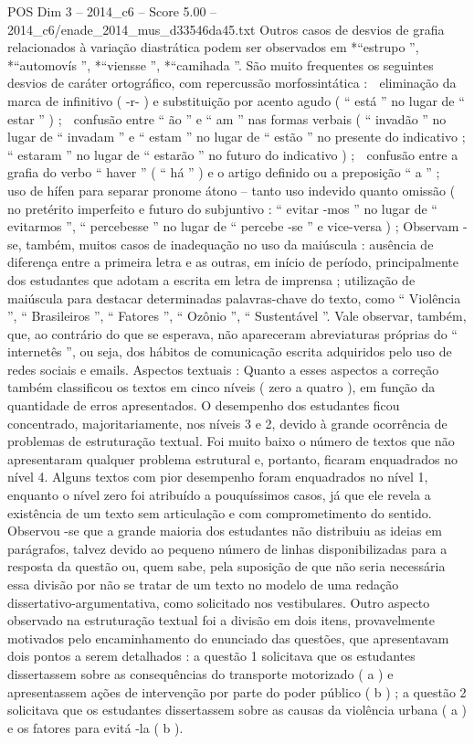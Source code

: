 \begin{textsample}{POS Dim 3 – 2014\_c6 – Score 5.00 – 2014\_c6/enade\_2014\_mus\_d33546da45.txt}
Outros casos de desvios de grafia relacionados à variação diastrática podem ser observados em *“estrupo ”, *“automovís ”, *“viensse ”, *“camihada ”.
São muito frequentes os seguintes desvios de caráter ortográfico, com repercussão morfossintática :  eliminação da marca de infinitivo ( -r- ) e substituição por acento agudo ( “ está ” no lugar de “ estar ” ) ;  confusão entre “ ão ” e “ am ” nas formas verbais ( “ invadão ” no lugar de “ invadam ” e “ estam ” no lugar de “ estão ” no presente do indicativo ; “ estaram ” no lugar de “ estarão ” no futuro do indicativo ) ;  confusão entre a grafia do verbo “ haver ” ( “ há ” ) e o artigo definido ou a preposição “ a ” ;  uso de hífen para separar pronome átono – tanto uso indevido quanto omissão ( no pretérito imperfeito e futuro do subjuntivo : “ evitar -mos ” no lugar de “ evitarmos ”, “ percebesse ” no lugar de “ percebe -se ” e vice-versa ) ; Observam -se, também, muitos casos de inadequação no uso da maiúscula : ausência de diferença entre a primeira letra e as outras, em início de período, principalmente dos estudantes que adotam a escrita em letra de imprensa ; utilização de maiúscula para destacar determinadas palavras-chave do texto, como “ Violência ”, “ Brasileiros ”, “ Fatores ”, “ Ozônio ”, “ Sustentável ”.
Vale observar, também, que, ao contrário do que se esperava, não apareceram abreviaturas próprias do “ internetês ”, ou seja, dos hábitos de comunicação escrita adquiridos pelo uso de redes sociais e emails.
Aspectos textuais : Quanto a esses aspectos a correção também classificou os textos em cinco níveis ( zero a quatro ), em função da quantidade de erros apresentados.
O desempenho dos estudantes ficou concentrado, majoritariamente, nos níveis 3 e 2, devido à grande ocorrência de problemas de estruturação textual.
Foi muito baixo o número de textos que não apresentaram qualquer problema estrutural e, portanto, ficaram enquadrados no nível 4.
Alguns textos com pior desempenho foram enquadrados no nível 1, enquanto o nível zero foi atribuído a pouquíssimos casos, já que ele revela a existência de um texto sem articulação e com comprometimento do sentido.
Observou -se que a grande maioria dos estudantes não distribuiu as ideias em parágrafos, talvez devido ao pequeno número de linhas disponibilizadas para a resposta da questão ou, quem sabe, pela suposição de que não seria necessária essa divisão por não se tratar de um texto no modelo de uma redação dissertativo-argumentativa, como solicitado nos vestibulares.
Outro aspecto observado na estruturação textual foi a divisão em dois itens, provavelmente motivados pelo encaminhamento do enunciado das questões, que apresentavam dois pontos a serem detalhados : a questão 1 solicitava que os estudantes dissertassem sobre as consequências do transporte motorizado ( a ) e apresentassem ações de intervenção por parte do poder público ( b ) ; a questão 2 solicitava que os estudantes dissertassem sobre as causas da violência urbana ( a ) e os fatores para evitá -la ( b ).

\end{textsample}
